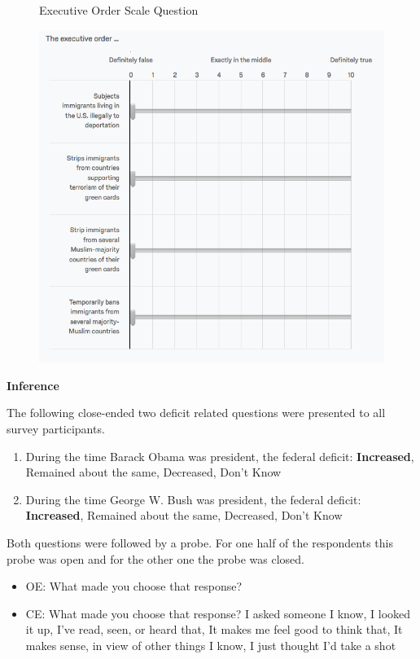 \begin{center}
	\begin{figure}[H]
		\centering
		\caption{Executive Order Scale Question}
		\includegraphics[width=\textwidth]{../figs/hk_eo1.png}
		\label{fig:eo1}
		\caption*{\footnotesize }
	\end{figure}
\end{center}

\newpage

\noindent
\textbf{Inference}

The following close-ended two deficit related questions were presented to all survey participants.

\begin{enumerate}
    \item During the time Barack Obama was president, the federal deficit: \textbf{Increased}, Remained about the same, Decreased, Don’t Know
    \item During the time George W. Bush was president, the federal deficit: \textbf{Increased}, Remained about the same, Decreased, Don’t Know
\end{enumerate}

Both questions were followed by a probe. For one half of the respondents this probe was open and for the other one the probe was closed.
\begin{itemize}
 \item OE: What made you choose that response?
 \item CE: What made you choose that response? I asked someone I know, I looked it up, I’ve read, seen, or heard that, It makes me feel good to think that, It makes sense, in view of other things I know, I just thought I’d take a shot
\end{itemize}
